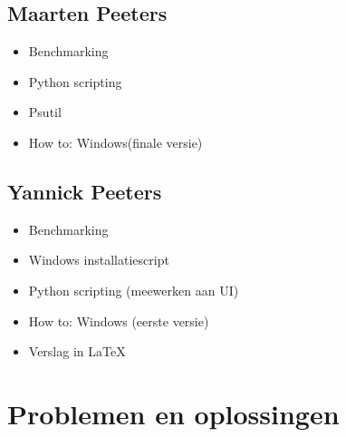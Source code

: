 \documentclass[DIV=calc]{scrartcl}
\begin{document}
\subsection{Maarten Peeters}
\begin{itemize}
	\item Benchmarking
	\item Python scripting
	\item Psutil
	\item How to: Windows(finale versie)
\end{itemize}
\subsection{Yannick Peeters}
\begin{itemize}
	\item Benchmarking
	\item Windows installatiescript
	\item Python scripting (meewerken aan UI)
	\item How to: Windows (eerste versie)
	\item Verslag in LaTeX
\end{itemize}
\section{Problemen en oplossingen}
\end{document}

